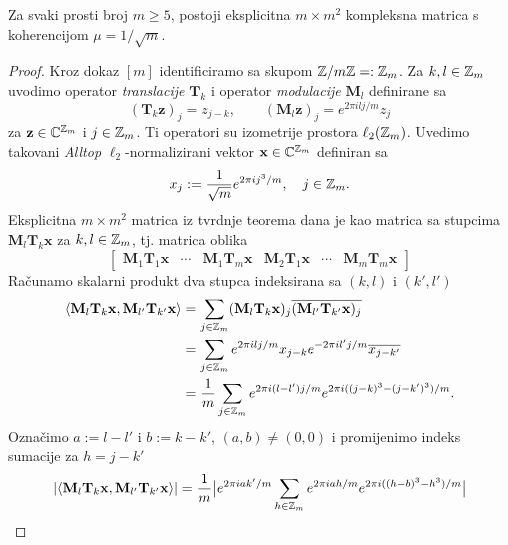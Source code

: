 \documentclass[a4paper,twoside,12pt]{memoir} %
\newcommand{\vect}[1]{\mathbf{#1}}
\renewcommand{\vec}{\vect}
\begin{document}
\begin{thm}\label{tm:5:13}
    Za svaki prosti broj $m \geq 5$, postoji eksplicitna $m \times m^2$ kompleksna matrica s koherencijom $\mu = 1/\sqrt{m}$.
\end{thm}
\begin{proof}
    Kroz dokaz $[m]$ identificiramo sa skupom $\mathbb{Z} / m \mathbb{Z} =: \mathbb{Z}_m$. Za $k,l \in \mathbb{Z}_m$ uvodimo operator \textit{translacije} $\vec T_k$ i operator \textit{modulacije} $\vec M_l$ definirane sa
    \begin{equation*}
        (\vec T_k \vec z)_j  = z_{j-k}, \quad \quad (\vec M_l \vec z)_j = e^{2 \pi i l j / m}z_j 
    \end{equation*}
    za $\vec z \in \C^{\Z_m}$ i $j \in \mathbb{Z}_m$. Ti operatori su izometrije prostora $\ell_2(\mathbb{Z}_m)$. Uvedimo takovani \textit{Alltop} $\ell_2$-normalizirani vektor $\vec x \in \C^{\Z_m}$ definiran sa
    \begin{equation*}
        x_j := \frac{1}{\sqrt{m}}e^{2\pi i j^3/m}, \quad j \in \mathbb{Z}_m .
    \end{equation*}
    Eksplicitna $m \times m^2$ matrica iz tvrdnje teorema dana je kao matrica sa stupcima $\vec M_l \vec T_k \vec x$ za $k,l \in \mathbb{Z}_m$, tj. matrica oblika
    \begin{equation*}
        \begin{bmatrix*}
            \vec M_1 \vec T_1 \vec x & \cdots & \vec M_1 \vec T_m \vec x & \vec M_2 \vec T_1 \vec x & \cdots & \vec M_m \vec T_m \vec x 
        \end{bmatrix*} 
    \end{equation*}
    Ra\v{c}unamo skalarni produkt dva stupca indeksirana sa $(k,l)$ i $(k', l')$
    \begin{align*}
        \langle \vec M_l \vec T_k \vec x, \vec M_{l'} \vec T_{k'} \vec x \rangle &= \sum_{j \in \Z_m} (\vec M_{l} \vec T_{k} \vec x)_j \overline{(\vec M_{l'} \vec T_{k'} \vec x)_j} \\
        &= \sum_{j \in \Z_m} e^{2 \pi ilj/m}x_{j-k} e^{-2 \pi il'j/m}\overline{x_{j-k'}}\\ 
        &= \frac{1}{m} \sum_{j \in \Z_m} e^{2 \pi i(l-l')j/m} e^{2 \pi i((j-k)^3 - (j - k')^3)/m}.
    \end{align*}
    Ozna\v{c}imo $a := l - l'$ i $b := k - k'$, $(a,b) \neq (0,0)$ i promijenimo indeks sumacije za $h = j - k'$
    \begin{align*}
        |\langle \vec M_l \vec T_k \vec x, \vec M_{l'} \vec T_{k'} \vec x \rangle| &= \frac{1}{m} \big |   e^{2 \pi iak'/m}  \sum_{h \in \Z_m} e^{2 \pi iah/m}e^{2 \pi i ((h-b)^3 - h^3)/m}  \big | \\

\end{align*}
\end{proof}
\end{document}
